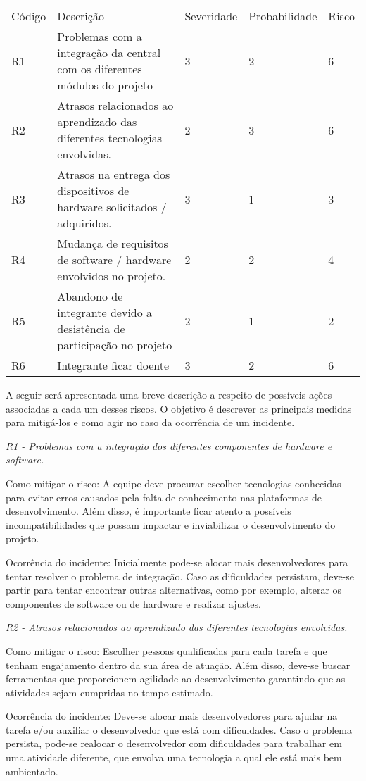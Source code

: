 \tabulinesep=1mm
\begin{longtabu} spread 0pt [c]{*5{|X[-1]}|}
\hline
Código &Descrição &Severidade &Probabilidade &Risco  \\
R1 &Problemas com a integração da central com os diferentes módulos do projeto &3 &2 &6  \\
R2 &Atrasos relacionados ao aprendizado das diferentes tecnologias envolvidas. &2 &3 &6  \\
R3 &Atrasos na entrega dos dispositivos de hardware solicitados / adquiridos. &3 &1 &3  \\
R4 &Mudança de requisitos de software / hardware envolvidos no projeto. &2 &2 &4  \\
R5 &Abandono de integrante devido a desistência de participação no projeto &2 &1 &2  \\
R6 &Integrante ficar doente &3 &2 &6  \\
\end{longtabu}


A seguir será apresentada uma breve descrição a respeito de possíveis ações associadas a cada um desses riscos. O objetivo é descrever as principais medidas para mitigá-\/los e como agir no caso da ocorrência de um incidente.

{\itshape R1 -\/ Problemas com a integração dos diferentes componentes de hardware e software.}


\begin{DoxyItemize}
\item Como mitigar o risco\+: A equipe deve procurar escolher tecnologias conhecidas para evitar erros causados pela falta de conhecimento nas plataformas de desenvolvimento. Além disso, é importante ficar atento a possíveis incompatibilidades que possam impactar e inviabilizar o desenvolvimento do projeto.
\item Ocorrência do incidente\+: Inicialmente pode-\/se alocar mais desenvolvedores para tentar resolver o problema de integração. Caso as dificuldades persistam, deve-\/se partir para tentar encontrar outras alternativas, como por exemplo, alterar os componentes de software ou de hardware e realizar ajustes.
\end{DoxyItemize}

{\itshape R2 -\/ Atrasos relacionados ao aprendizado das diferentes tecnologias envolvidas.}


\begin{DoxyItemize}
\item Como mitigar o risco\+: Escolher pessoas qualificadas para cada tarefa e que tenham engajamento dentro da sua área de atuação. Além disso, deve-\/se buscar ferramentas que proporcionem agilidade ao desenvolvimento garantindo que as atividades sejam cumpridas no tempo estimado.
\item Ocorrência do incidente\+: Deve-\/se alocar mais desenvolvedores para ajudar na tarefa e/ou auxiliar o desenvolvedor que está com dificuldades. Caso o problema persista, pode-\/se realocar o desenvolvedor com dificuldades para trabalhar em uma atividade diferente, que envolva uma tecnologia a qual ele está mais bem ambientado.
\end{DoxyItemize}

